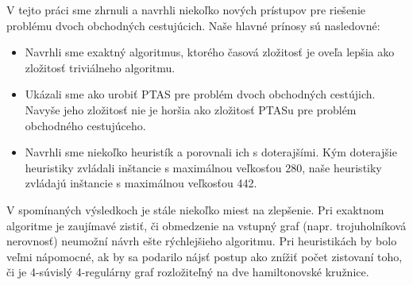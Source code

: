 V tejto práci sme zhrnuli a navrhli niekoľko nových prístupov
pre riešenie problému dvoch obchodných cestujúcich.
Naše hlavné prínosy sú nasledovné:
\begin{itemize}
\item Navrhli sme exaktný algoritmus, ktorého časová zložitosť je oveľa
lepšia ako zložitosť triviálneho algoritmu.
\item Ukázali sme ako urobiť PTAS pre problém dvoch obchodných cestújich.
Navyše jeho zložitosť nie je horšia ako zložitosť PTASu pre problém obchodného
cestujúceho.
\item Navrhli sme niekoľko heuristík a porovnali ich s doterajšími.
Kým doterajšie heuristiky zvládali inštancie s maximálnou veľkosťou 280, naše
heuristiky zvládajú inštancie s maximálnou veľkosťou 442.
\end{itemize}

V spomínaných výsledkoch je stále niekoľko miest na zlepšenie.
Pri exaktnom algoritme je zaujímavé zistiť, či obmedzenie na vstupný graf
(napr. trojuholníková nerovnosť) neumožní návrh ešte rýchlejšieho algoritmu.
Pri heuristikách by bolo veľmi nápomocné, ak by sa podarilo nájsť postup
ako znížiť počet zistovaní toho, či je 4-súvislý 4-regulárny graf rozložiteľný
na dve hamiltonovské kružnice.
